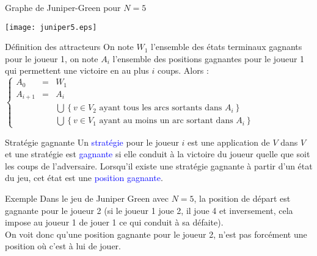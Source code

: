 \documentclass[10pt]{beamer}
\begin{document}
\begin{frame}[fragile]{\Ctitle}{\stitle}
	\begin{exampleblock}{Graphe de Juniper-Green pour $N=5$}
		\begin{center}
			\texttt{[image: juniper5.eps]}
		\end{center}
	\end{exampleblock}
\end{frame}

\begin{frame}[fragile]{\Ctitle}{\stitle}
	\begin{block}{Définition des attracteurs}
		On note $W_1$ l'ensemble des états terminaux gagnants pour le joueur 1, on note $A_i$ l'ensemble des positions gagnantes pour le joueur 1 qui permettent une victoire en au plus $i$ coups. Alors : \\
		$\left\{ 
			\begin{array}{lll}
				A_0 &=& W_1 \\
				A_{i+1} & = & A_{i}  \\
						&  & \bigcup \left\{ v \in V_2 \text{ ayant tous les arcs sortants dans } A_i \right\}\\
						& &  \bigcup \left\{ v \in V_1 \text{ ayant au moins un arc sortant dans } A_i \right\}
			\end{array}
		\right.$
	\end{block}
	\begin{alertblock}{Stratégie gagnante}
		Un \textcolor{blue}{stratégie} pour le joueur $i$ est une application de $V$ dans $V$ et une stratégie est \textcolor{blue}{gagnante} si elle conduit à la victoire du joueur quelle que soit les coups de l'adversaire. Lorsqu'il existe une stratégie gagnante à partir d'un état du jeu, cet état est une \textcolor{blue}{position gagnante}.
	\end{alertblock}
\end{frame}

\begin{frame}[fragile]{\Ctitle}{\stitle}
	\begin{exampleblock}{Exemple}
		Dans le jeu de Juniper Green avec $N=5$, la position de départ est gagnante pour le joueur 2 (si le joueur 1 joue 2, il joue 4 et inversement, cela impose au joueur 1 de jouer 1 ce qui conduit à sa défaite). \\
		\smallskip
		On voit donc qu'une position gagnante pour le joueur 2, n'est pas forcément une position où c'est à lui de jouer.
	\end{exampleblock}
\end{frame}
\end{document}

